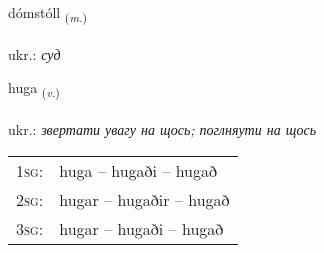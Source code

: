 \documentclass[frontgrid, backgrid]{flacards}\usepackage[]{graphicx}\usepackage[]{xcolor}
\begin{document}
\renewcommand{\flhead}{\vskip5pt \fboxsep=0pt {\small\bfseries\footnotesize Nafnorð | іменник}}
\renewcommand{\fcfoot}{\vskip5pt \fboxsep=0pt \hspace{2pt}{\small\bfseries\footnotesize 2K}}

\renewcommand{\blhead}{\vskip5pt {\small\bfseries\footnotesize Nafnorð | іменник }}
\renewcommand{\bcfoot}{\vskip5pt \hspace{2pt}{\small\bfseries\footnotesize 2K}}


{dómstóll \small{\textsubscript{(\textit{m.})}} \\[1ex] %
\textphonetic{[toumstoutl̥]} \\
ukr.: \emph{суд} \\  [2ex]
\renewcommand*{\arraystretch}{0.8}
}

\renewcommand{\flhead}{\vskip5pt \fboxsep=0pt {\small\bfseries\footnotesize Sagnorð | дієслово}}
\renewcommand{\fcfoot}{\vskip5pt \fboxsep=0pt \hspace{2pt}{\small\bfseries\footnotesize 2K}}

\renewcommand{\blhead}{\vskip5pt {\small\bfseries\footnotesize Sagnorð | дієслово }}
\renewcommand{\bcfoot}{\vskip5pt \hspace{2pt}{\small\bfseries\footnotesize 2K}}


{huga \small{\textsubscript{(\textit{v.})}} \\[1ex] %
\textphonetic{[hʏːɣa]} \\
ukr.: \emph{звертати увагу на щось; поглняути на щось} \\  [2ex]
\renewcommand*{\arraystretch}{0.8}
\begin{tabular}{p{1cm}l}
\textsc{1sg}: & huga -- hugaði -- hugað \\ 
\textsc{2sg}: & hugar -- hugaðir -- hugað \\ 
\textsc{3sg}: & hugar -- hugaði -- hugað \\ 
\end{tabular}
}
\end{document}
